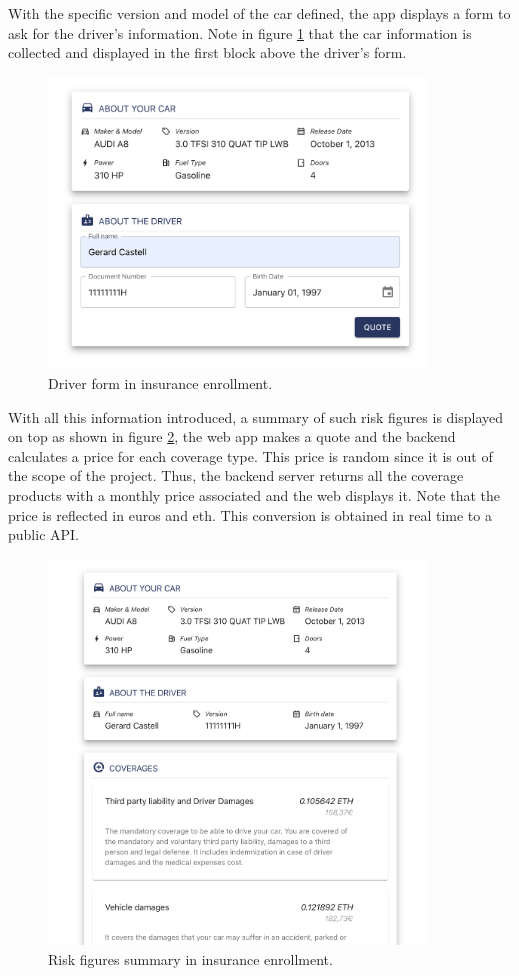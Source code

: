 {With the specific version and model of the car defined, the app displays a form to ask for the driver's information. Note in figure \ref{fig:checkout-driver-form} that the car information is collected and displayed in the first block above the driver's form.

\begin{figure}[H]
\centering
\includegraphics[width=10cm]{img/results/checkout-about-you.png}
\caption[Insurechain: Driver form in insurance enrollment]{\footnotesize{Driver form in insurance enrollment.}}
\label{fig:checkout-driver-form}
\end{figure}

With all this information introduced, a summary of such risk figures is displayed on top as shown in figure \ref{fig:checkout-coverage-selection}, the web app makes a quote and the backend calculates a price for each coverage type. This price is random since it is out of the scope of the project. Thus, the backend server returns all the coverage products with a monthly price associated and the web displays it. Note that the price is reflected in euros and \acrshort{eth}. This conversion is obtained in real time to a public API.

\begin{figure}[H]
\centering
\includegraphics[width=10cm]{img/results/checkout-coverage-selection.png}
\caption[Insurechain: Risk figures summary in insurance enrollment]{\footnotesize{Risk figures summary in insurance enrollment.}}
\label{fig:checkout-coverage-selection}
\end{figure}

}
